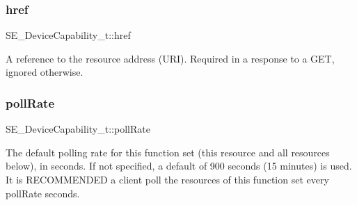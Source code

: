 \subsubsection{\texorpdfstring{href}{href}}
{\footnotesize\ttfamily S\+E\+\_\+\+Device\+Capability\+\_\+t\+::href}

A reference to the resource address (U\+RI). Required in a response to a G\+ET, ignored otherwise. \mbox{\label{group__DeviceCapability_gad92ad6a3b915fb56c09a651873754141}} 
\subsubsection{\texorpdfstring{poll\+Rate}{pollRate}}
{\footnotesize\ttfamily S\+E\+\_\+\+Device\+Capability\+\_\+t\+::poll\+Rate}

The default polling rate for this function set (this resource and all resources below), in seconds. If not specified, a default of 900 seconds (15 minutes) is used. It is R\+E\+C\+O\+M\+M\+E\+N\+D\+ED a client poll the resources of this function set every poll\+Rate seconds. 
